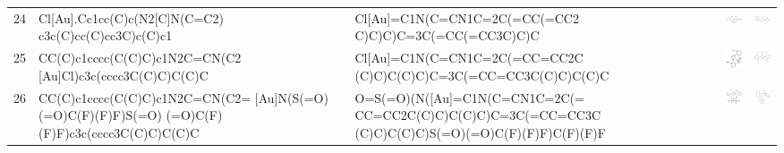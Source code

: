 \begin{landscape}
\begin{longtable}{m{0.3cm}m{6.7cm}m{7.7cm}m{2.3cm}m{2.3cm}}
 24 &
 Cl[Au].Cc1cc(C)c(N2[C]N(C=C2) c3c(C)cc(C)cc3C)c(C)c1 & 
 Cl[Au]=C1N(C=CN1C=2C(=CC(=CC2 C)C)C)C=3C(=CC(=CC3C)C)C & 
 \includegraphics[width=2.2cm]{imagenes/sigmaAldrich/pdf/[(IMes)AuCl].pdf} & 
 \includegraphics[width=2.2cm]{imagenes/sciFinder/pdf/[(IMes)AuCl].pdf} \\


 25 &
 CC(C)c1cccc(C(C)C)c1N2C=CN(C2 [Au]Cl)c3c(cccc3C(C)C)C(C)C & 
 Cl[Au]=C1N(C=CN1C=2C(=CC=CC2C (C)C)C(C)C)C=3C(=CC=CC3C(C)C)C(C)C & 
 \includegraphics[width=2.2cm]{imagenes/sigmaAldrich/[(IPr)AuCl].png} & 
 \includegraphics[width=2.2cm]{imagenes/sciFinder/pdf/[(IPr)AuCl].pdf} \\

 26 &
 CC(C)c1cccc(C(C)C)c1N2C=CN(C2= [Au]N(S(=O)(=O)C(F)(F)F)S(=O) (=O)C(F)(F)F)c3c(cccc3C(C)C)C(C)C & 
 O=S(=O)(N([Au]=C1N(C=CN1C=2C(= CC=CC2C(C)C)C(C)C)C=3C(=CC=CC3C (C)C)C(C)C)S(=O)(=O)C(F)(F)F)C(F)(F)F & 
 \includegraphics[width=2.1cm]{imagenes/sigmaAldrich/IPrAuNTf2.png} & 
 \includegraphics[width=2.2cm]{imagenes/sciFinder/pdf/IPrAuNTf2.pdf} \\


\end{longtable}
\end{landscape}
